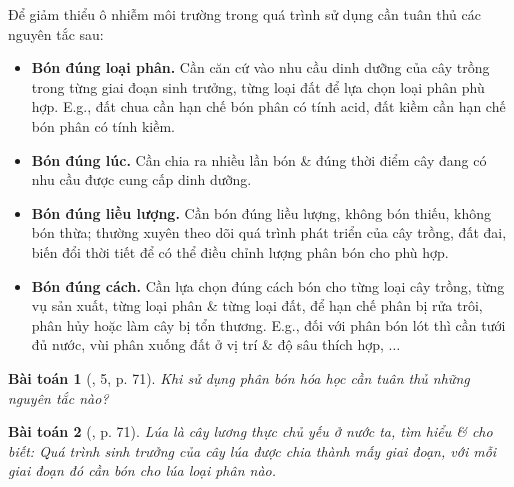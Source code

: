 \documentclass{article}
\newtheorem{baitoan}{Bài toán}
\begin{document}
Để giảm thiểu ô nhiễm môi trường trong quá trình sử dụng cần tuân thủ các nguyên tắc sau:
\begin{itemize}
	\item \textbf{Bón đúng loại phân.} Cần căn cứ vào nhu cầu dinh dưỡng của cây trồng trong từng giai đoạn sinh trưởng, từng loại đất để lựa chọn loại phân phù hợp. E.g., đất chua cần hạn chế bón phân có tính acid, đất kiềm cần hạn chế bón phân có tính kiềm.
	\item \textbf{Bón đúng lúc.} Cần chia ra nhiều lần bón \& đúng thời điểm cây đang có nhu cầu được cung cấp dinh dưỡng.
	\item \textbf{Bón đúng liều lượng.} Cần bón đúng liều lượng, không bón thiếu, không bón thừa; thường xuyên theo dõi quá trình phát triển của cây trồng, đất đai, biến đổi thời tiết để có thể điều chỉnh lượng phân bón cho phù hợp.
	\item \textbf{Bón đúng cách.} Cần lựa chọn đúng cách bón cho từng loại cây trồng, từng vụ sản xuất, từng loại phân \& từng loại đất, để hạn chế phân bị rửa trôi, phân hủy hoặc làm cây bị tổn thương. E.g., đối với phân bón lót thì cần tưới đủ nước, vùi phân xuống đất ở vị trí \& độ sâu thích hợp, $\ldots$
\end{itemize}

\begin{baitoan}[\cite{SGK_KHTN_8_Canh_Dieu}, 5, p. 71]
	Khi sử dụng phân bón hóa học cần tuân thủ những nguyên tắc nào?
\end{baitoan}

\begin{baitoan}[\cite{SGK_KHTN_8_Canh_Dieu}, p. 71]
	Lúa là cây lương thực chủ yếu ở nước ta, tìm hiểu \& cho biết: Quá trình sinh trưởng của cây lúa được chia thành mấy giai đoạn, với mỗi giai đoạn đó cần bón cho lúa loại phân nào.
\end{baitoan}
\noindent{}

\end{document}

